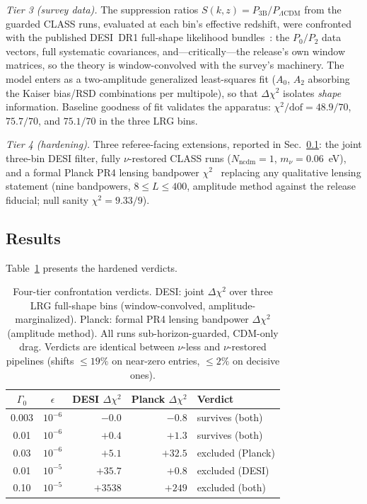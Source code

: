 \documentclass[aps,prd,twocolumn,superscriptaddress,nofootinbib]{revtex4-2}
\theoremstyle{definition}
\theoremstyle{remark}
\begin{document}
\emph{Tier 3 (survey data).} The suppression ratios
$S(k,z) = P_{\mathrm{3B}}/P_{\Lambda\mathrm{CDM}}$ from the guarded
CLASS runs, evaluated at each bin's effective redshift, were confronted
with the published DESI~DR1 full-shape likelihood
bundles~\cite{DESI2024FS}: the $P_0/P_2$ data vectors, full systematic
covariances, and---critically---the release's own window matrices, so
the theory is window-convolved with the survey's machinery. The model
enters as a two-amplitude generalized least-squares fit ($A_0$, $A_2$
absorbing the Kaiser bias/RSD combinations per multipole), so that
$\Delta\chi^2$ isolates \emph{shape} information. Baseline goodness of
fit validates the apparatus: $\chi^2/\mathrm{dof} = 48.9/70$, $75.7/70$,
and $75.1/70$ in the three LRG bins.

\emph{Tier 4 (hardening).} Three referee-facing extensions, reported in
Sec.~\ref{sec:hardening}: the joint three-bin DESI filter, fully
$\nu$-restored CLASS runs ($N_{\mathrm{ncdm}} = 1$, $m_\nu = 0.06$~eV),
and a formal Planck PR4 lensing bandpower
$\chi^2$~\cite{CarronPR42022} replacing any qualitative lensing
statement (nine bandpowers, $8 \le L \le 400$, amplitude method against
the release fiducial; null sanity $\chi^2 = 9.33/9$).

\subsection{Results}
\label{sec:hardening}

Table~\ref{tab:confrontation} presents the hardened verdicts.

\begin{table}[t]
\centering
\caption{Four-tier confrontation verdicts. DESI: joint
$\Delta\chi^2$ over three LRG full-shape bins (window-convolved,
amplitude-marginalized). Planck: formal PR4 lensing bandpower
$\Delta\chi^2$ (amplitude method). All runs sub-horizon-guarded,
CDM-only drag. Verdicts are identical between $\nu$-less and
$\nu$-restored pipelines (shifts $\le 19\%$ on near-zero entries,
$\le 2\%$ on decisive ones).}
\label{tab:confrontation}
\begin{tabular}{ccrrl}
\toprule
$\Gamma_0$ & $\epsilon$ & DESI $\Delta\chi^2$ & Planck $\Delta\chi^2$ & Verdict \\
\midrule
0.003 & $10^{-6}$ & $-0.0$ & $-0.8$ & survives (both) \\
0.01  & $10^{-6}$ & $+0.4$ & $+1.3$ & survives (both) \\
0.03  & $10^{-6}$ & $+5.1$ & $+32.5$ & excluded (Planck) \\
0.01  & $10^{-5}$ & $+35.7$ & $+0.8$ & excluded (DESI) \\
0.10  & $10^{-5}$ & $+3538$ & $+249$ & excluded (both) \\
\bottomrule
\end{tabular}
\end{table}
\end{document}
